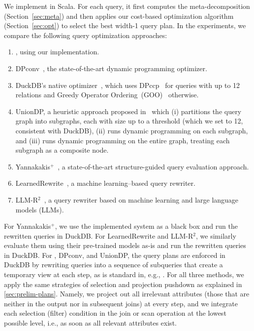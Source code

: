 We implement \sys{} in Scala. For each query, it first computes the meta-decomposition (Section~\ref{sec:meta}) and then applies our cost-based optimization algorithm (Section~\ref{sec:opt}) to select the best width-1 query plan.  
In the experiments, we compare the following query optimization approaches:
\begin{enumerate}[leftmargin=*]
    \item \sys{}, using our implementation.
    \item DPconv~\cite{stoian_dpconv_2024}, the state-of-the-art dynamic programming optimizer.
    \item DuckDB's native optimizer~\cite{raasveldt_duckdb_2019}, which uses \textsf{DPccp}~\cite{moerkotte_dynamic_2008} for queries with up to 12 relations and Greedy Operator Ordering~(GOO)~\cite{fegaras_new_1998} otherwise.
    \item UnionDP, a heuristic approach proposed in~\cite[Algorithm~4]{mancini_efficient_2022} which (i) partitions the query graph into subgraphs, each with size up to a threshold (which we set to 12, consistent with DuckDB), (ii) runs dynamic programming on each subgraph, and (iii) runs dynamic programming on the entire graph, treating each subgraph as a composite node.
    \item Yannakakis$^+$~\cite{wang_yannakakis_2025}, a state-of-the-art structure-guided query evaluation approach.
    \item LearnedRewrite~\cite{zhou_learned_2023,zhou_learned_2021}, a machine learning--based query rewriter.
    \item LLM-R$^2$~\cite{li_llm-r2_2024}, a query rewriter based on machine learning and large language models (LLMs).
\end{enumerate}
For Yannakakis$^+$, we use the implemented system as a black box and run the rewritten queries in DuckDB.
For LearnedRewrite and LLM-R$^2$, we similarly evaluate them using their pre-trained models as-is and run the rewritten queries in DuckDB.
For \sys{}, DPconv, and UnionDP, the query plans are enforced in DuckDB by rewriting queries into a sequence of subqueries that create a temporary view at each step, as is standard in, e.g., \cite{wang_yannakakis_2025,gottlob_reaching_2023}.  For all three methods, we apply the same strategies of selection and projection pushdown as explained in \cref{sec:prelim-plans}. Namely, we project out all irrelevant attributes (those that are neither in the output nor in subsequent joins) at every step, and we integrate each selection (filter) condition in the join or scan operation at the lowest possible level, i.e., as soon as all relevant attributes exist.

